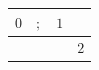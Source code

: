 {\scriptsize\setlength{\tabcolsep}{1.5pt}%
\begin{tabular}{ccc|l}
$\text{0}$ & $;$ & $\text{1}$ & \\ \hline
\gcell{$\posC{\circ}$} & \gcell{$$} & \gcell{$\posD{\bullet}$} & $\text{2}$ \\
\end{tabular}}
